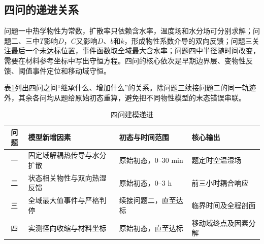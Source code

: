 \subsection{四问的递进关系}

问题一中热学物性为常数，扩散率只依赖含水率，温度场和水分场可分别求解；问题二、三中$T$影响$D$，$C$又影响$D$、$b$和$k$，形成物性系数介导的双向反馈；问题三关注最后一个未达标位置，事件函数取全域最大含水率；问题四中半径随时间改变，需要在材料参考坐标中写出守恒方程。四问的核心依次是早期边界层、变物性反馈、阈值事件定位和移动域守恒。

表\ref{tab:problem-progression}列出四问之间“继承什么、增加什么”的关系。除问题三续接问题二的同一轨迹外，其余各问均从题给原始初态重算，避免把不同物性模型的末态错误串联。

\begin{table}[htbp]
  \caption{四问建模递进}
  \label{tab:problem-progression}
  \centering
  \begin{tabularx}{0.98\textwidth}{cXXX}
    \toprule
    问题 & 模型新增因素 & 初态与时间范围 & 核心输出 \\
    \midrule
    一 & 固定域解耦热传导与水分扩散 & 原始初态，0--30 min & 题定时空温湿场 \\
    二 & 状态相关物性与双向热湿反馈 & 原始初态，0--3 h & 前三小时耦合响应 \\
    三 & 全域最大值事件与严格判停 & 续接问题二，直至达标 & 临界时间及全程剖面 \\
    四 & 实测径向收缩与材料坐标 & 原始初态，直至达标 & 移动域终点及因素分解 \\
    \bottomrule
  \end{tabularx}
\end{table}

